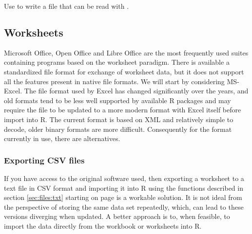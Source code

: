 \documentclass[krantz2]{krantz}\usepackage{knitr}%
\begin{document}
\begin{advplayground}
Use  to write a file that can be read with .
\end{advplayground}

\subsection{Worksheets}\label{sec:files:worksheets}

Microsoft Office, Open Office and Libre Office are the most frequently used suites containing programs based on the worksheet paradigm. There is available a standardized file format for exchange of worksheet data, but it does not support all the features present in native file formats. We will start by considering MS-Excel. The file format used by Excel has changed significantly over the years, and old formats tend to be less well supported by available R packages and may require the file to be updated to a more modern format with Excel itself before import into R. The current format is based on XML and relatively simple to decode, older binary formats are more difficult. Consequently for the format currently in use, there are alternatives.

\subsubsection{Exporting CSV files}

If you have access to the original software used, then exporting a worksheet to a text file in CSV format and importing it into R using the functions described in section \ref{sec:files:txt} starting on page \pageref{sec:files:txt} is a workable solution. It is not ideal from the perspective of storing the same data set repeatedly, which, can lead to these versions diverging when updated. A better approach is to, when feasible, to import the data directly from the workbook or worksheets into R.

\subsubsection['readxl']{}\label{sec:files:excel}
\end{document}
